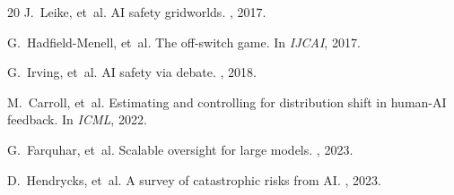 \documentclass[11pt]{article}
\begin{document}
\begin{thebibliography}{20}
J.~Leike, et~al.
\newblock AI safety gridworlds.
, 2017.

G.~Hadfield-Menell, et~al.
\newblock The off-switch game.
\newblock In {\em IJCAI}, 2017.

G.~Irving, et~al.
\newblock AI safety via debate.
, 2018.

M.~Carroll, et~al.
\newblock Estimating and controlling for distribution shift in human-AI feedback.
\newblock In {\em ICML}, 2022.

G.~Farquhar, et~al.
\newblock Scalable oversight for large models.
, 2023.

D.~Hendrycks, et~al.
\newblock A survey of catastrophic risks from AI.
, 2023.

\end{thebibliography}
\end{document}

